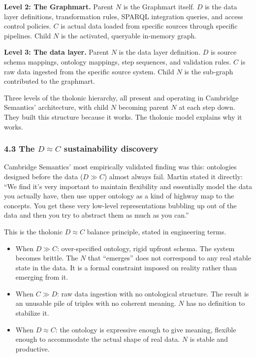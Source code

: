 \documentclass[12pt]{article}
\providecommand{\tightlist}{%
  \setlength{\itemsep}{0pt}\setlength{\parskip}{0pt}}
\begin{document}
\textbf{Level 2: The Graphmart.} Parent \(N\) is the Graphmart itself.
\(D\) is the data layer definitions, transformation rules, SPARQL
integration queries, and access control policies. \(C\) is actual data
loaded from specific sources through specific pipelines. Child \(N\) is
the activated, queryable in-memory graph.

\textbf{Level 3: The data layer.} Parent \(N\) is the data layer
definition. \(D\) is source schema mappings, ontology mappings, step
sequences, and validation rules. \(C\) is raw data ingested from the
specific source system. Child \(N\) is the sub-graph contributed to the
graphmart.

Three levels of the tholonic hierarchy, all present and operating in
Cambridge Semantics' architecture, with child \(N\) becoming parent
\(N\) at each step down. They built this structure because it works. The
tholonic model explains why it works.

\subsubsection{\texorpdfstring{4.3 The \(D \approx C\) sustainability
discovery}{4.3 The D \textbackslash approx C sustainability discovery}}\label{the-d-approx-c-sustainability-discovery}

Cambridge Semantics' most empirically validated finding was this:
ontologies designed before the data (\(D \gg C\)) almost always fail.
Martin stated it directly: ``We find it's very important to maintain
flexibility and essentially model the data you actually have, then use
upper ontology as a kind of highway map to the concepts. You get these
very low-level representations bubbling up out of the data and then you
try to abstract them as much as you can.''

This is the tholonic \(D \approx C\) balance principle, stated in
engineering terms.

\begin{itemize}
\tightlist
\item
  When \(D \gg C\): over-specified ontology, rigid upfront schema. The
  system becomes brittle. The \(N\) that ``emerges'' does not correspond
  to any real stable state in the data. It is a formal constraint
  imposed on reality rather than emerging from it.
\item
  When \(C \gg D\): raw data ingestion with no ontological structure.
  The result is an unusable pile of triples with no coherent meaning.
  \(N\) has no definition to stabilize it.
\item
  When \(D \approx C\): the ontology is expressive enough to give
  meaning, flexible enough to accommodate the actual shape of real data.
  \(N\) is stable and productive.
\end{itemize}
\end{document}
